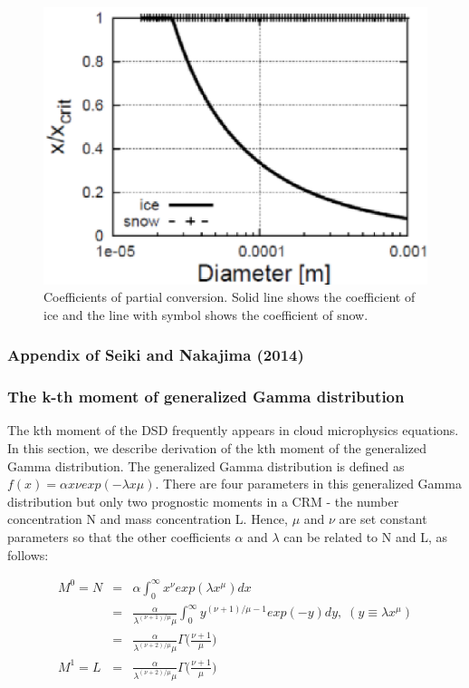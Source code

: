 \begin{figure}[htpb]
\begin{center}
\includegraphics[scale=0.5]{./figure/partial_conversion_coef.eps}
\end{center}
\caption{Coefficients of partial conversion. Solid line shows the coefficient of ice and the line with symbol shows the coefficient of snow.}
\label{figsn2-23}
\end{figure}

\subsubsection{Appendix of Seiki and Nakajima (2014)}
\subsubsection{The k-th moment of generalized Gamma distribution}
The kth moment of the DSD frequently appears in cloud microphysics equations. In this section, we describe derivation of the kth moment of the generalized Gamma distribution. The generalized Gamma distribution is defined as $f(x) = \alpha x \nu exp(-\lambda x \mu)$. There are four parameters in this generalized Gamma distribution but only two prognostic moments in a CRM - the number concentration N and mass concentration L. Hence, $\mu$ and $\nu$ are set constant parameters so that the other coefficients $\alpha$ and $\lambda$ can be related to N and L, as follows:

\begin{eqnarray}
M^{0}=N&=&\alpha\int_{0}^{\infty}x^{\nu}exp(\lambda x^{\mu})dx\nonumber\\
&=&\frac{\alpha}{\lambda^{(\nu+1)/\mu}\mu}\int_{0}^{\infty}y^{(\nu+1)/\mu-1}exp(-y)dy,\;(y\equiv\lambda x^{\mu})\nonumber\\
&=&\frac{\alpha}{\lambda^{(\nu+2)/\mu}\mu}\Gamma\bigl(\frac{\nu+1}{\mu}\bigr)\label{sn255}\\
M^{1}=L&=&\frac{\alpha}{\lambda^{(\nu+2)/\mu}\mu}\Gamma\bigl(\frac{\nu+1}{\mu}\bigr)\nonumber
\end{eqnarray}

